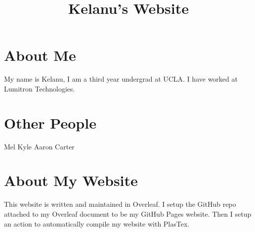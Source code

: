 \documentclass{article}
\title{Kelanu's Website}
\begin{document}
\maketitle
\section{About Me}
My name is Kelanu, I am a third year undergrad at UCLA. I have worked at Lumitron Technologies.

\newpage
\section{Other People}
Mel
Kyle
Aaron
Carter

\newpage
\section{About My Website}
This website is written and maintained in Overleaf. I setup the GitHub repo attached to my Overleaf document to be my GitHub Pages website. Then I setup an action to automatically compile my website with PlasTex.
\end{document}
